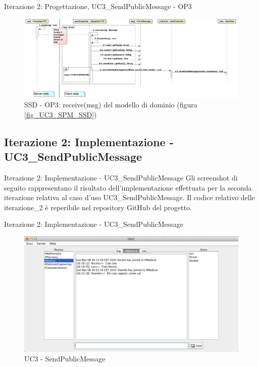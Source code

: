 \begin{frame} {Iterazione 2: Progettazione, UC3\_SendPublicMessage - OP3}
   \begin{figure}
     \includegraphics[scale=0.14]{image_astah/Iteration_2_DesignModel/UC3_SendPublicMessage_SSD_3_receiveMsg.png}{\centering}
     \caption{SSD - OP3: receive(msg) del modello di dominio (figura \ref{fig_UC3_SPM_SSD})}
     \label{fig_UC3_SSD_SRM_3} 
   \end{figure}
\end{frame}

\subsection{Iterazione 2: Implementazione - UC3\_SendPublicMessage}
 \begin{frame} {Iterazione 2: Implementazione - UC3\_SendPublicMessage }
   Gli screenshot di seguito rappresentano il risultato dell'implementazione effettuata per la seconda iterazione relativa al caso d'uso UC3\_SendPublicMessage.
   \newline
   Il codice relativo delle iterazione\_2 è reperibile nel repository GitHub del progetto.
 \end{frame}


\begin{frame} {Iterazione 2: Implementazione - UC3\_SendPublicMessage}
   \begin{figure}
    \includegraphics[scale=0.32]{image_implementation/uc3/9.png}{\centering}
    \caption{UC3 - SendPublicMessage }
   \end{figure}
 \end{frame}

